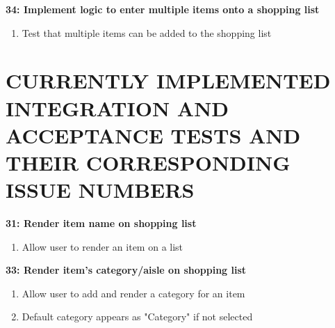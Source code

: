 \documentclass[10pt,onecolumn]{witseiepaper}
\begin{document}
\textbf{34: Implement logic to enter multiple items onto a shopping list}

\begin{enumerate}
	\item Test that multiple items can be added to the shopping list
\end{enumerate}

\vspace{5mm}
\section*{CURRENTLY IMPLEMENTED INTEGRATION AND ACCEPTANCE TESTS AND THEIR CORRESPONDING ISSUE NUMBERS}




\textbf{31: Render item name on shopping list}

\begin{enumerate}
	\item Allow user to render an item on a list
\end{enumerate}

\textbf{33: Render item's category/aisle on shopping list}

\begin{enumerate}
	\item Allow user to add and render a category for an item
	\item Default category appears as "Category" if not selected
\end{enumerate}
\end{document}
